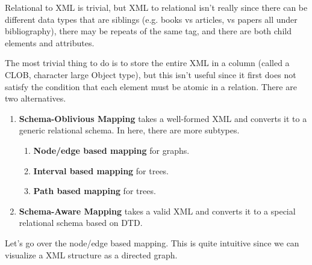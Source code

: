   Relational to XML is trivial, but XML to relational isn't really since there can be different data types that are siblings (e.g. books vs articles, vs papers all under bibliography), there may be repeats of the same tag, and there are both child elements and attributes. 
  
  The most trivial thing to do is to store the entire XML in a column (called a CLOB, character large Object type), but this isn't useful since it first does not satisfy the condition that each element must be atomic in a relation. There are two alternatives. 
  \begin{enumerate}
    \item \textbf{Schema-Oblivious Mapping} takes a well-formed XML and converts it to a generic relational schema. In here, there are more subtypes. 
      \begin{enumerate}
        \item \textbf{Node/edge based mapping} for graphs. 
        \item \textbf{Interval based mapping} for trees.
        \item \textbf{Path based mapping} for trees. 
      \end{enumerate}
    \item \textbf{Schema-Aware Mapping} takes a valid XML and converts it to a special relational schema based on DTD. 
  \end{enumerate} 

  Let's go over the node/edge based mapping. This is quite intuitive since we can visualize a XML structure as a directed graph. 


